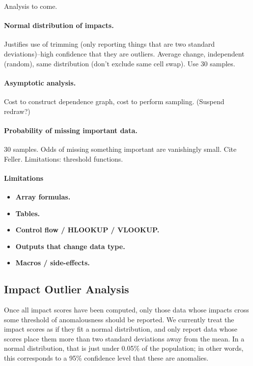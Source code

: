 Analysis to come.

\paragraph{Normal distribution of impacts.}

Justifies use of trimming (only reporting things that are two standard
deviations)--high confidence that they are outliers.  Average change,
independent (random), same distribution (don't exclude same cell
swap). Use 30 samples.

\paragraph{Asymptotic analysis.}

Cost to construct dependence graph, cost to perform sampling. (Suspend redraw?)

\paragraph{Probability of missing important data.}

30 samples. Odds of missing something important are vanishingly small.
Cite Feller. Limitations: threshold functions.

\paragraph{Limitations}

\begin{itemize}
\item {\bf Array formulas.}
\item {\bf Tables.}
\item {\bf Control flow / HLOOKUP / VLOOKUP.}
\item {\bf Outputs that change data type.}
\item {\bf Macros / side-effects.}
\end{itemize}

\subsection{Impact Outlier Analysis}

Once all impact scores have been computed, only those data whose
impacts cross some threshold of anomalousness should be
reported. We currently treat the impact scores as if they fit a normal
distribution, and only report data whose scores place them more
than two standard deviations away from the mean. In a normal
distribution, that is just under 0.05\% of the population; in other
words, this corresponds to a 95\% confidence level that these are
anomalies.

